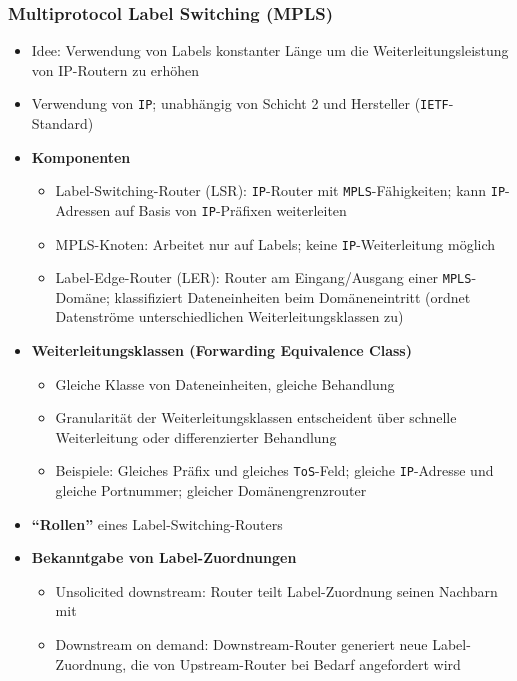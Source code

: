 \subsubsection{Multiprotocol Label Switching (MPLS)}
\begin{itemize}
	\item Idee: Verwendung von Labels konstanter Länge um die Weiterleitungsleistung von IP-Routern zu erhöhen
	\item Verwendung von \texttt{IP}; unabhängig von Schicht 2 und Hersteller (\texttt{IETF}-Standard)
	\item \textbf{Komponenten}
	\begin{itemize}
		\item Label-Switching-Router (LSR): \texttt{IP}-Router mit \texttt{MPLS}-Fähigkeiten; kann \texttt{IP}-Adressen auf Basis von \texttt{IP}-Präfixen weiterleiten
		\item MPLS-Knoten: Arbeitet nur auf Labels; keine \texttt{IP}-Weiterleitung möglich
		\item Label-Edge-Router (LER): Router am Eingang/Ausgang einer \texttt{MPLS}-Domäne; klassifiziert Dateneinheiten beim Domäneneintritt (ordnet Datenströme unterschiedlichen Weiterleitungsklassen zu)
	\end{itemize}
	\item \textbf{Weiterleitungsklassen (Forwarding Equivalence Class)}
	\begin{itemize}
		\item Gleiche Klasse von Dateneinheiten, gleiche Behandlung
		\item Granularität der Weiterleitungsklassen entscheident über schnelle Weiterleitung oder differenzierter Behandlung
		\item Beispiele: Gleiches Präfix und gleiches \texttt{ToS}-Feld; gleiche \texttt{IP}-Adresse und gleiche Portnummer; gleicher Domänengrenzrouter
	\end{itemize}
	\item \textbf{"`Rollen"'} eines Label-Switching-Routers
	\item \textbf{Bekanntgabe von Label-Zuordnungen}
	\begin{itemize}
		\item Unsolicited downstream: Router teilt Label-Zuordnung seinen Nachbarn mit
		\item Downstream on demand: Downstream-Router generiert neue Label-Zuordnung, die von Upstream-Router bei Bedarf angefordert wird
	\end{itemize}
\end{itemize}



